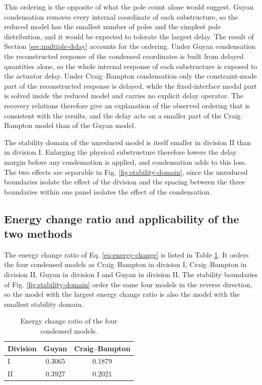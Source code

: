 \documentclass[11pt,a4paper]{article}
\numberwithin{equation}{section}
\begin{document}
This ordering is the opposite of what the pole count alone would suggest. Guyan condensation removes every internal coordinate of each substructure, so the reduced model has the smallest number of poles and the simplest pole distribution, and it would be expected to tolerate the largest delay. The result of Section \ref{sec:multiple-delay} accounts for the ordering. Under Guyan condensation the reconstructed response of the condensed coordinates is built from delayed quantities alone, so the whole internal response of each substructure is exposed to the actuator delay. Under Craig--Bampton condensation only the constraint-mode part of the reconstructed response is delayed, while the fixed-interface modal part is solved inside the reduced model and carries no explicit delay operator. The recovery relations therefore give an explanation of the observed ordering that is consistent with the results, and the delay acts on a smaller part of the Craig--Bampton model than of the Guyan model.

The stability domain of the unreduced model is itself smaller in division II than in division I. Enlarging the physical substructure therefore lowers the delay margin before any condensation is applied, and condensation adds to this loss. The two effects are separable in Fig. \ref{fig:stability-domain}, since the unreduced boundaries isolate the effect of the division and the spacing between the three boundaries within one panel isolates the effect of the condensation.

\subsection{Energy change ratio and applicability of the two methods}
\label{sec:energy-applicability}

The energy change ratio of Eq. \eqref{eq:energy-change} is listed in Table \ref{tab:energy}. It orders the four condensed models as Craig--Bampton in division I, Craig--Bampton in division II, Guyan in division I and Guyan in division II. The stability boundaries of Fig. \ref{fig:stability-domain} order the same four models in the reverse direction, so the model with the largest energy change ratio is also the model with the smallest stability domain.

\begin{table}[htbp]
	\centering
	\caption{Energy change ratio of the four condensed models.}
	\label{tab:energy}
	\begin{tabular}{lcc}
		\toprule
		Division & Guyan & Craig--Bampton\\
		\midrule
		I  & 0.3065 & 0.1879\\
		II & 0.3927 & 0.2021\\
		\bottomrule
	\end{tabular}
\end{table}
\end{document}
